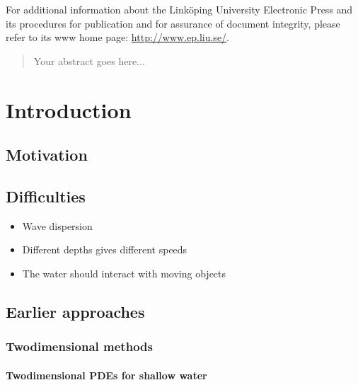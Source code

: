\documentclass[a4paper]{report}
\begin{document}
For additional information about the Linköping University Electronic Press and its procedures for publication and for assurance of document integrity, please refer to its www home page: \url{http://www.ep.liu.se/}.


\begin{abstract}
    Your abstract goes here...
\end{abstract}

\tableofcontents
\listoftables
\listoffigures


\part{Introduction}

\chapter{Motivation}

\chapter{Difficulties}

\begin{itemize}
    \item Wave dispersion
    \item Different depths gives different speeds
    \item The water should interact with moving objects
\end{itemize}

\chapter{Earlier approaches}

\section{Twodimensional methods}

\subsection{Twodimensional PDEs for shallow water}
\end{document}
